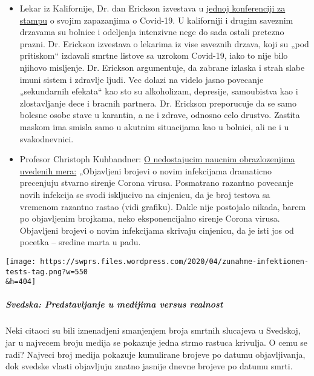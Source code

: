 \begin{itemize}
{  neuroloskih ostecenja,} posebno kod dece, kao i do zahteva za
  obestecenje u milionskim iznosima.
\item
  Lekar iz Kalifornije, Dr. dan Erickson izvestava u
  \href{https://www.turnto23.com/news/coronavirus/video-interview-with-dr-dan-erickson-and-dr-artin-massihi-taken-down-from-youtube}{jednoj
  konferenciji za stampu} o svojim zapazanjima o Covid-19. U kaliforniji
  i drugim saveznim drzavama su bolnice i odeljenja intenzivne nege do
  sada ostali pretezno prazni. Dr. Erickson izvestava o lekarima iz vise
  saveznih drzava, koji su „pod pritiskom`` izdavali smrtne listove sa
  uzrokom Covid-19, iako to nije bilo njihovo misljenje. Dr. Erickson
  argumentuje, da zabrane izlaska i strah slabe imuni sistem i zdravlje
  ljudi. Vec dolazi na videlo jasno povecanje „sekundarnih efekata`` kao
  sto su alkoholizam, depresije, samoubistva kao i zlostavljanje dece i
  bracnih partnera. Dr. Erickson preporucuje da se samo bolesne osobe
  stave u karantin, a ne i zdrave, odnosno celo drustvo. Zastita maskom
  ima smisla samo u akutnim situacijama kao u bolnici, ali ne i u
  svakodnevnici.
\item
  Profesor Christoph Kuhbandner:
  \href{https://www.heise.de/tp/features/Von-der-fehlenden-wissenschaftlichen-Begruendung-der-Corona-Massnahmen-4709563.html?seite=all}{O
  nedostajucim naucnim obrazlozenjima uvedenih mera:} „Objavljeni
  brojevi o novim infekcijama dramaticno precenjuju stvarno sirenje
  Corona virusa. Posmatrano razantno povecanje novih infekcija se svodi
  iskljucivo na cinjenicu, da je broj testova sa vremenom razantno
  rastao (vidi grafiku). Dakle nije postojalo nikada, barem po
  objavljenim brojkama, neko eksponencijalno sirenje Corona virusa.
  Objavljeni brojevi o novim infekcijama skrivaju cinjenicu, da je isti
  jos od pocetka -- sredine marta u padu.
\end{itemize}

\texttt{[image: https://swprs.files.wordpress.com/2020/04/zunahme-infektionen-tests-tag.png?w=550\\\&h=404]}

\hypertarget{svedska-predstavljanje-u-medijima-versus-realnost}{%
\subparagraph{\texorpdfstring{\textbf{Svedska: Predstavljanje u medijima
versus
realnost}}{Svedska: Predstavljanje u medijima versus realnost}}\label{svedska-predstavljanje-u-medijima-versus-realnost}}

Neki citaoci su bili iznenadjeni smanjenjem broja smrtnih slucajeva u
Svedskoj, jar u najvecem broju medija se pokazuje jedna strmo rastuca
krivulja. O cemu se radi? Najveci broj medija pokazuje kumulirane
brojeve po datumu objavljivanja, dok svedske vlasti objavljuju znatno
jasnije dnevne brojeve po datumu smrti.

